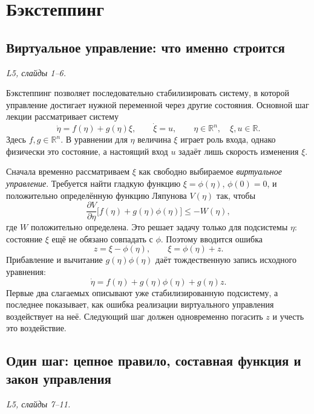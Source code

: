 \section{Бэкстеппинг}
\label{sec:backstepping}

\subsection{Виртуальное управление: что именно строится}
\textit{L5, слайды 1--6.}

Бэкстеппинг позволяет последовательно стабилизировать систему,
в которой управление достигает нужной переменной через другие состояния.
Основной шаг лекции рассматривает систему
\[
  \dot\eta=f(\eta)+g(\eta)\xi,\qquad \dot\xi=u,
  \qquad \eta\in\mathbb R^n,\quad \xi,u\in\mathbb R.
\]
Здесь $f,g\in\mathbb R^n$. В уравнении для $\eta$ величина $\xi$
играет роль входа, однако физически это состояние, а настоящий вход $u$
задаёт лишь скорость изменения $\xi$.

Сначала временно рассматриваем $\xi$ как свободно выбираемое
\emph{виртуальное управление}. Требуется найти гладкую функцию
$\xi=\phi(\eta)$, $\phi(0)=0$, и положительно определённую функцию
Ляпунова $V(\eta)$ так, чтобы
\[
  \frac{\partial V}{\partial\eta}
  \bigl[f(\eta)+g(\eta)\phi(\eta)\bigr]
  \le -W(\eta),
\]
где $W$ положительно определена. Это решает задачу только для
подсистемы $\eta$: состояние $\xi$ ещё не обязано совпадать с $\phi$.
Поэтому вводится ошибка
\[
  z=\xi-\phi(\eta),\qquad \xi=\phi(\eta)+z.
\]
Прибавление и вычитание $g(\eta)\phi(\eta)$ даёт тождественную запись
исходного уравнения:
\[
  \dot\eta=f(\eta)+g(\eta)\phi(\eta)+g(\eta)z.
\]
Первые два слагаемых описывают уже стабилизированную подсистему,
а последнее показывает, как ошибка реализации виртуального управления
воздействует на неё. Следующий шаг должен одновременно погасить $z$
и учесть это воздействие.

\subsection{Один шаг: цепное правило, составная функция и закон управления}
\textit{L5, слайды 7--11.}

